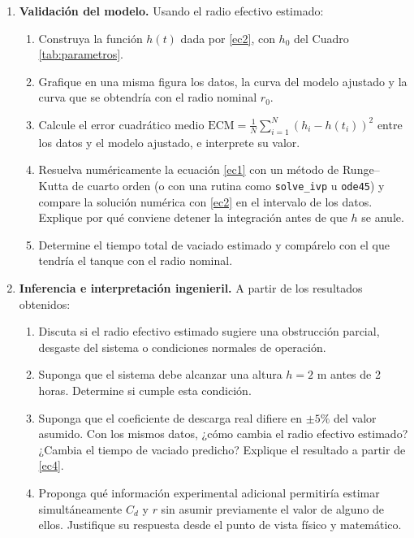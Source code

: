 \documentclass[oneside,letter,spanish,activeacute,english,links,10pt]{amcaGCS_EDO}
\begin{document}
\begin{enumerate}
	\item {\bf Validación del modelo.}
	Usando el radio efectivo estimado:
	\begin{enumerate}
		\item Construya la función $h(t)$ dada por \eqref{ec2}, con $h_0$ del Cuadro \ref{tab:parametros}.
		\item Grafique en una misma figura los datos, la curva del modelo ajustado y la curva que se obtendría con el radio nominal $r_0$.
		\item Calcule el error cuadrático medio $\mathrm{ECM}=\frac{1}{N}\sum_{i=1}^{N}\left(h_i-h(t_i)\right)^2$ entre los datos y el modelo ajustado, e interprete su valor.
		\item Resuelva numéricamente la ecuación \eqref{ec1} con un método de Runge--Kutta de cuarto orden (o con una rutina como \texttt{solve\_ivp} u \texttt{ode45}) y compare la solución numérica con \eqref{ec2} en el intervalo de los datos. Explique por qué conviene detener la integración antes de que $h$ se anule.
		\item Determine el tiempo total de vaciado estimado y compárelo con el que tendría el tanque con el radio nominal.
	\end{enumerate}
	
	\item {\bf Inferencia e interpretación ingenieril.}
	A partir de los resultados obtenidos:
	\begin{enumerate}
		\item Discuta si el radio efectivo estimado sugiere una obstrucción parcial, desgaste del sistema o condiciones normales de operación.
		\item Suponga que el sistema debe alcanzar una altura $h=2$ m antes de 2 horas. Determine si cumple esta condición.
		\item Suponga que el coeficiente de descarga real difiere en $\pm 5\%$ del valor asumido. Con los mismos datos, ¿cómo cambia el radio efectivo estimado? ¿Cambia el tiempo de vaciado predicho? Explique el resultado a partir de \eqref{ec4}.
		\item Proponga qué información experimental adicional permitiría estimar simultáneamente $C_d$ y $r$ sin asumir previamente el valor de alguno de ellos. Justifique su respuesta desde el punto de vista físico y matemático.
	\end{enumerate}
\end{enumerate}
\end{document}
